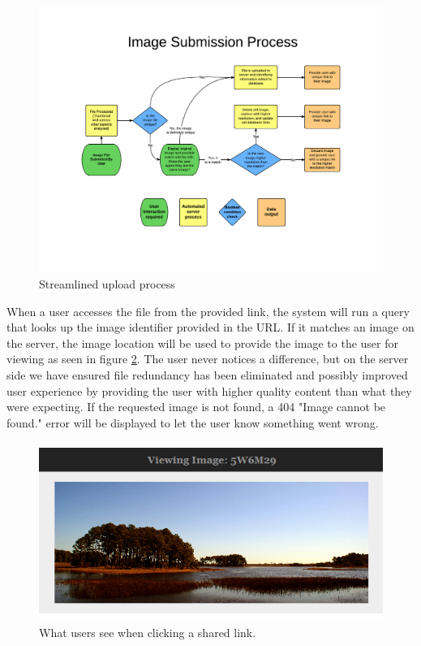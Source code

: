 \begin{figure}[htbp]
\centering
\includegraphics[trim={3cm 3.5cm 2cm 4.2cm},clip, width=6in]{upproc}
\caption{Streamlined upload process}
\label{method-fig1}
\end{figure}

When a user accesses the file from the provided link, the system will run a query that looks up the image identifier provided in the URL. If it matches an image on the server, the image location will be used to provide the image to the user for viewing as seen in figure \ref{viewimage}. The user never notices a difference, but on the server side we have ensured file redundancy has been eliminated and possibly improved user experience by providing the user with higher quality content than what they were expecting. If the requested image is not found, a 404 "Image cannot be found." error will be displayed to let the user know something went wrong.

\begin{figure}[htbp]
\centering
\includegraphics[width=5in]{viewimage}
\caption{What users see when clicking a shared link.}
\label{viewimage}
\end{figure}

